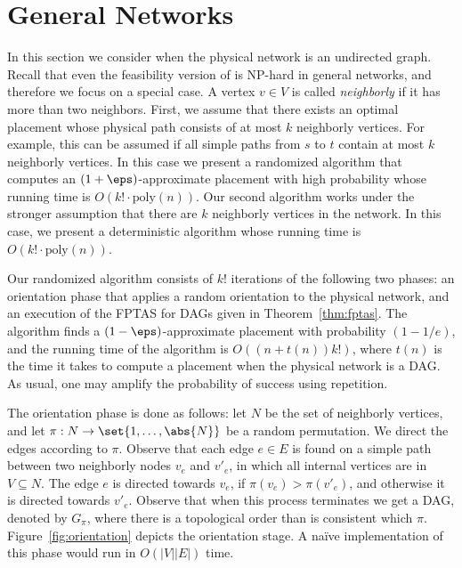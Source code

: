 
\section{General Networks}
\label{sec:general}

In this section we consider \scp when the physical network is an
undirected graph.  
Recall that even the feasibility version of \scp is NP-hard in general networks,
and therefore we focus on a special case.
%
A vertex $v \in V$ is called \emph{neighborly} if it has more than two
neighbors.
%
First, we assume that there exists an optimal placement whose physical
path consists of at most $k$ neighborly vertices.  For example, this
can be assumed if all simple paths from $s$ to $t$ contain at most $k$
neighborly vertices.  In this case we present a randomized algorithm
that computes an $(1+\eps)$-approximate placement with high
probability whose running time is $O(k! \cdot \text{poly}(n))$.
%
Our second algorithm works under the stronger assumption that there
are $k$ neighborly vertices in the network.  In this case, we present
a deterministic algorithm whose running time is $O(k! \cdot
\text{poly}(n))$.


Our randomized algorithm consists of $k!$ iterations of the
following two phases: an orientation phase that applies a random
orientation to the physical network, and an execution of the FPTAS for
DAGs given in Theorem~\ref{thm:fptas}.  The algorithm finds a
$(1-\eps)$-approximate placement with probability $(1-1/e)$, and the
running time of the algorithm is $O((n+t(n))k!)$, where $t(n)$ is the
time it takes to compute a placement when the physical network is a
DAG.
%
As usual, one may amplify the probability of success using repetition.

The orientation phase is done as follows: 
let $N$ be the set of neighborly vertices, 
and let $\pi:N \to \set{1,\ldots,\abs{N}}$ be a random permutation.  
We direct the edges according to $\pi$.  
Observe that each edge $e \in E$ is found on a simple path between two
neighborly nodes $v_e$ and $v'_e$, in which all internal vertices are
in $V \subseteq N$.  
The edge $e$ is directed towards $v_e$, if $\pi(v_e) > \pi(v'_e)$, 
and otherwise it is directed towards $v'_e$.
%
Observe that when this process terminates we get a DAG, denoted by
$G_\pi$, where there is a topological order than is consistent which
$\pi$.  Figure~\ref{fig:orientation} depicts the orientation stage.
%
A na\"ive implementation of this phase would run in $O(|V||E|)$ time.

